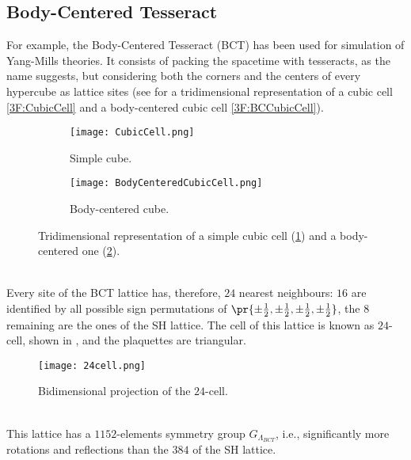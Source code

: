 \subsection{Body-Centered Tesseract\label{Sec3:BCT}}
For example, the Body-Centered Tesseract (BCT) has been used for simulation of Yang-Mills theories.
It consists of packing the spacetime with tesseracts, as the name suggests, but considering both the corners and the centers of every hypercube as lattice sites (see  for a tridimensional representation of a cubic cell \eqref{3F:CubicCell} and a body-centered cubic cell \eqref{3F:BCCubicCell}).\\
\begin{figure}[!htbp]
    \centering
    \hspace{0.1\textwidth}
    \begin{subfigure}[b]{0.25\textwidth}
        \texttt{[image: CubicCell.png]}
        \caption{Simple cube.}
        \label{3F:CubicCell}
    \end{subfigure}
    \hspace{0.2\textwidth}
    \begin{subfigure}[b]{0.25\textwidth}
        \texttt{[image: BodyCenteredCubicCell.png]}
        \caption{Body-centered cube.}
        \label{3F:BCCubicCell}
    \end{subfigure}
    \hspace{0.2\textwidth}
    \caption{Tridimensional representation of a simple cubic cell (\ref{3F:CubicCell}) and a body-centered one (\ref{3F:BCCubicCell}).}
    \label{3F:ScBccCells}
\end{figure}\\
Every site of the BCT lattice has, therefore, $24$ nearest neighbours: $16$ are identified by all possible sign permutations of $\pr{\pm\frac12,\pm\frac12,\pm\frac12,\pm\frac12}$, the $8$ remaining are the ones of the SH lattice.
The cell of this lattice is known as $24$-cell, shown in , and the plaquettes are triangular.
\begin{figure}[!htbp]
    \centering
    \texttt{[image: 24cell.png]}
    \caption{Bidimensional projection of the $24$-cell.}
    \label{3F:24cell}
\end{figure}\\
This lattice has a $1152$-elements symmetry group $G_{\Lambda_{BCT}}$, i.e., significantly more rotations and reflections than the $384$ of the SH lattice.

